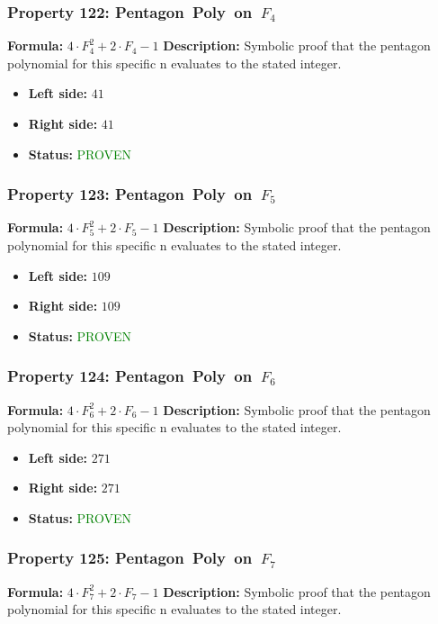\subsubsection*{Property 122: Pentagon~Poly~on~$F_{4}$}
\textbf{Formula:} $4 \cdot F_4^2 + 2 \cdot F_4 - 1$
\textbf{Description:} Symbolic proof that the pentagon polynomial for this specific n evaluates to the stated integer.

\begin{itemize}
\item \textbf{Left side:} $41$
\item \textbf{Right side:} $41$
\item \textbf{Status:} \textcolor{green}{PROVEN}
\end{itemize}

\subsubsection*{Property 123: Pentagon~Poly~on~$F_{5}$}
\textbf{Formula:} $4 \cdot F_5^2 + 2 \cdot F_5 - 1$
\textbf{Description:} Symbolic proof that the pentagon polynomial for this specific n evaluates to the stated integer.

\begin{itemize}
\item \textbf{Left side:} $109$
\item \textbf{Right side:} $109$
\item \textbf{Status:} \textcolor{green}{PROVEN}
\end{itemize}

\subsubsection*{Property 124: Pentagon~Poly~on~$F_{6}$}
\textbf{Formula:} $4 \cdot F_6^2 + 2 \cdot F_6 - 1$
\textbf{Description:} Symbolic proof that the pentagon polynomial for this specific n evaluates to the stated integer.

\begin{itemize}
\item \textbf{Left side:} $271$
\item \textbf{Right side:} $271$
\item \textbf{Status:} \textcolor{green}{PROVEN}
\end{itemize}

\subsubsection*{Property 125: Pentagon~Poly~on~$F_{7}$}
\textbf{Formula:} $4 \cdot F_7^2 + 2 \cdot F_7 - 1$
\textbf{Description:} Symbolic proof that the pentagon polynomial for this specific n evaluates to the stated integer.

